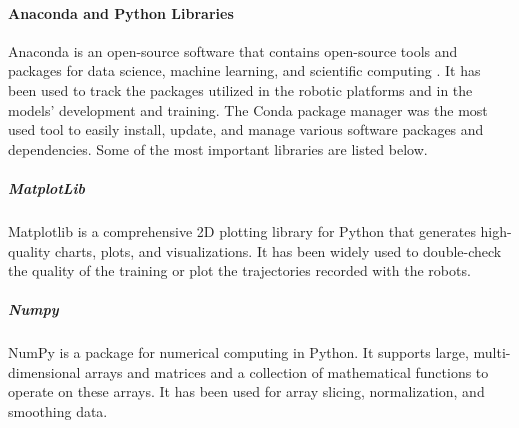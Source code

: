\paragraph{Anaconda and Python Libraries}
Anaconda is an open-source software that contains open-source tools and packages for data science, machine learning, and scientific computing \cite{url:anaconda}. It has been used to track the packages utilized in the robotic platforms and in the models' development and training. The Conda package manager was the most used tool to easily install, update, and manage various software packages and dependencies. Some of the most important libraries are listed below.
\subparagraph{MatplotLib} Matplotlib is a comprehensive 2D plotting library for Python that generates high-quality charts, plots, and visualizations. It has been widely used to double-check the quality of the training or plot the trajectories recorded with the robots. 
\subparagraph{Numpy} NumPy is a package for numerical computing in Python. It supports large, multi-dimensional arrays and matrices and a collection of mathematical functions to operate on these arrays. It has been used for array slicing, normalization, and smoothing data. 
